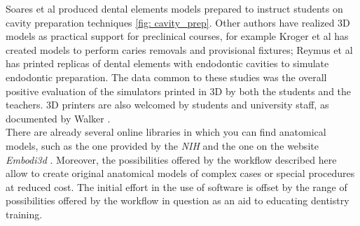 Soares et al \parencite{Reference71} produced dental elements models prepared to instruct students on cavity preparation techniques \ref{fig: cavity_prep}. Other authors have realized 3D models as practical support for preclinical courses, for example Kroger et al \parencite{Reference72} has created models to perform caries removals and provisional fixtures; Reymus et al \parencite{Reference73} has printed replicas of dental elements with endodontic cavities to simulate endodontic preparation. The data common to these studies was the overall positive evaluation of the simulators printed in 3D by both the students and the teachers. 3D printers are also welcomed by students and university staff, as documented by Walker \parencite{Reference74}. \\
There are already several online libraries in which you can find anatomical models, such as the one provided by the \emph{NIH} \parencite{Reference75} and the one on the website \emph{Embodi3d} \parencite{Reference76}. Moreover, the possibilities offered by the workflow described here allow to create original anatomical models of complex cases or special procedures at reduced cost. The initial effort in the use of software is offset by the range of possibilities offered by the workflow in question as an aid to educating dentistry training.


